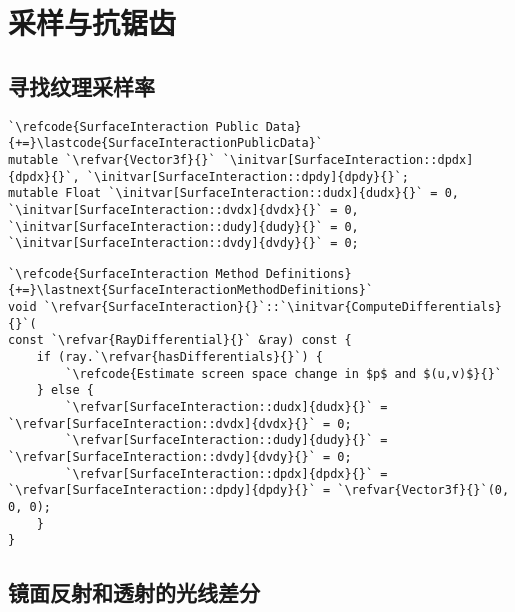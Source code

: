 \section{采样与抗锯齿}\label{sec:采样与抗锯齿}


\subsection{寻找纹理采样率}\label{sub:寻找纹理采样率}
\begin{lstlisting}
`\refcode{SurfaceInteraction Public Data}{+=}\lastcode{SurfaceInteractionPublicData}`
mutable `\refvar{Vector3f}{}` `\initvar[SurfaceInteraction::dpdx]{dpdx}{}`, `\initvar[SurfaceInteraction::dpdy]{dpdy}{}`;
mutable Float `\initvar[SurfaceInteraction::dudx]{dudx}{}` = 0, `\initvar[SurfaceInteraction::dvdx]{dvdx}{}` = 0, `\initvar[SurfaceInteraction::dudy]{dudy}{}` = 0, `\initvar[SurfaceInteraction::dvdy]{dvdy}{}` = 0;
\end{lstlisting}

\begin{lstlisting}
`\refcode{SurfaceInteraction Method Definitions}{+=}\lastnext{SurfaceInteractionMethodDefinitions}`
void `\refvar{SurfaceInteraction}{}`::`\initvar{ComputeDifferentials}{}`(
const `\refvar{RayDifferential}{}` &ray) const {
    if (ray.`\refvar{hasDifferentials}{}`) {
        `\refcode{Estimate screen space change in $p$ and $(u,v)$}{}`
    } else {
        `\refvar[SurfaceInteraction::dudx]{dudx}{}` = `\refvar[SurfaceInteraction::dvdx]{dvdx}{}` = 0;
        `\refvar[SurfaceInteraction::dudy]{dudy}{}` = `\refvar[SurfaceInteraction::dvdy]{dvdy}{}` = 0;
        `\refvar[SurfaceInteraction::dpdx]{dpdx}{}` = `\refvar[SurfaceInteraction::dpdy]{dpdy}{}` = `\refvar{Vector3f}{}`(0, 0, 0);
    }
}
\end{lstlisting}

\subsection{镜面反射和透射的光线差分}\label{sub:镜面反射和透射的光线差分}